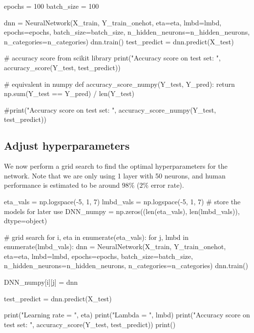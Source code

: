 \documentclass[%
oneside,                 %
final,                   %
10pt]{article}
\begin{document}
\bpycod
epochs = 100
batch_size = 100

dnn = NeuralNetwork(X_train, Y_train_onehot, eta=eta, lmbd=lmbd, epochs=epochs, batch_size=batch_size,
                    n_hidden_neurons=n_hidden_neurons, n_categories=n_categories)
dnn.train()
test_predict = dnn.predict(X_test)

# accuracy score from scikit library
print("Accuracy score on test set: ", accuracy_score(Y_test, test_predict))

# equivalent in numpy
def accuracy_score_numpy(Y_test, Y_pred):
    return np.sum(Y_test == Y_pred) / len(Y_test)

#print("Accuracy score on test set: ", accuracy_score_numpy(Y_test, test_predict))

\epycod


\subsection{Adjust hyperparameters}

We now perform a grid search to find the optimal hyperparameters for the network.  
Note that we are only using 1 layer with 50 neurons, and human performance is estimated to be around $98\%$ ($2\%$ error rate).






















\bpycod
eta_vals = np.logspace(-5, 1, 7)
lmbd_vals = np.logspace(-5, 1, 7)
# store the models for later use
DNN_numpy = np.zeros((len(eta_vals), len(lmbd_vals)), dtype=object)

# grid search
for i, eta in enumerate(eta_vals):
    for j, lmbd in enumerate(lmbd_vals):
        dnn = NeuralNetwork(X_train, Y_train_onehot, eta=eta, lmbd=lmbd, epochs=epochs, batch_size=batch_size,
                            n_hidden_neurons=n_hidden_neurons, n_categories=n_categories)
        dnn.train()
        
        DNN_numpy[i][j] = dnn
        
        test_predict = dnn.predict(X_test)
        
        print("Learning rate  = ", eta)
        print("Lambda = ", lmbd)
        print("Accuracy score on test set: ", accuracy_score(Y_test, test_predict))
        print()
\end{document}
